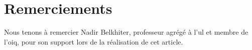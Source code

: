 \section*{Remerciements}
Nous tenons à remercier Nadir Belkhiter, professeur agrégé à l'\gls{ul} et membre de l'\gls{oiq}, pour son support lors de la réalisation de cet article. 
